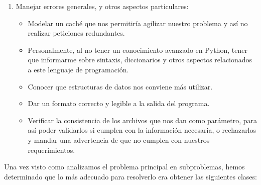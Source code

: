 \documentclass[letterpaper]{article}
\begin{document}
\begin{enumerate}
\begin{itemize}
	\end{itemize}
	\item Manejar errores generales, y otros aspectos particulares:
	\begin{itemize}
		\item Modelar un caché que nos permitiría agilizar nuestro problema y así no realizar peticiones redundantes.
		\item Personalmente, al no tener un conocimiento avanzado en Python, tener que informarme sobre sintaxis, diccionarios y otros aspectos relacionados a este lenguaje de programación. 
		\item Conocer que estructuras de datos nos conviene más utilizar.
		\item Dar un formato correcto y legible a la salida del programa.
		\item Verificar la consistencia de los archivos que nos dan como parámetro, para así poder validarlos si cumplen con la información necesaria, o rechazarlos y mandar una advertencia de que no cumplen con nuestros requerimientos.
	\end{itemize}
	
\end{enumerate}
Una vez visto como analizamos el problema principal en subproblemas, hemos determinado que lo más adecuado para resolverlo era obtener las siguientes clases:
\end{document}
